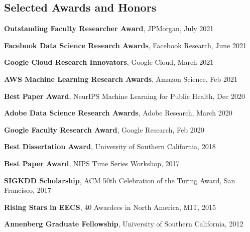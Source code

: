 \documentclass[margin,line]{res}
\newenvironment{list1}{
  \begin{list}{\ding{113}}{%
      \setlength{\itemsep}{0in}
      \setlength{\parsep}{0in} \setlength{\parskip}{0in}
      \setlength{\topsep}{0in} \setlength{\partopsep}{0in} 
      \setlength{\leftmargin}{0.17in}}}{\end{list}}
\begin{document}
\begin{resume}


\section{\sc Selected Awards and Honors} 


\textbf{Outstanding Faculty Researcher Award}, JPMorgan, July 2021

  
\textbf{Facebook Data Science Research Awards},  Facebook Research, June 2021


\textbf{Google Cloud Research Innovators}, Google Cloud, March 2021

\textbf{AWS Machine Learning Research Awards},  Amazon Science, Feb 2021

\textbf{Best Paper Award},  NeurIPS Machine Learning for Public Health, Dec 2020

\textbf{Adobe Data Science Research Awards},  Adobe Research, March 2020

\textbf{Google Faculty Research  Award},  Google Research, Feb 2020

\textbf{Best Dissertation Award}, University of Southern California, 2018

\textbf{Best Paper Award},  NIPS Time Series Workshop, 2017

\textbf{SIGKDD Scholarship},  ACM 50th Celebration of the Turing Award, San Francisco, 2017

\textbf{Rising Stars in EECS},  40 Awardees in North America, MIT, 2015

\textbf{Annenberg Graduate Fellowship}, University of Southern California, 2012







%


\end{resume}
\end{document}
